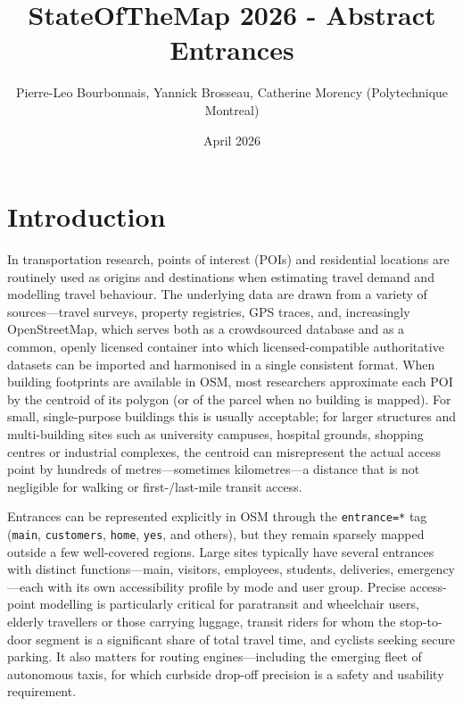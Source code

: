 \documentclass{article}
\title{StateOfTheMap 2026 - Abstract Entrances}
\author{Pierre-Leo Bourbonnais, Yannick Brosseau, Catherine Morency (Polytechnique Montreal)}
\date{April 2026}
\begin{document}
\maketitle



\section{Introduction}

In transportation research, points of interest (POIs) and residential
locations are routinely used as origins and destinations when
estimating travel demand and modelling travel behaviour. The
underlying data are drawn from a variety of sources---travel surveys,
property registries, GPS traces, and, increasingly OpenStreetMap,
which serves both as a crowdsourced database and as a common,
openly licensed container into which licensed-compatible authoritative
datasets can be imported and harmonised in a single consistent
format. When building footprints are available in OSM, most
researchers approximate each POI by the centroid of its polygon (or
of the parcel when no building is mapped). For small, single-purpose
buildings this is usually acceptable; for larger structures and
multi-building sites such as university campuses, hospital grounds,
shopping centres or industrial complexes, the centroid can
misrepresent the actual access point by hundreds of
metres---sometimes kilometres---a distance that is not negligible for
walking or first-/last-mile transit access.

Entrances can be represented explicitly in OSM through the
\texttt{entrance=*} tag (\texttt{main}, \texttt{customers},
\texttt{home}, \texttt{yes}, and others), but they remain sparsely
mapped outside a few well-covered regions. Large sites typically have
several entrances with distinct functions---main, visitors,
employees, students, deliveries, emergency---each with its own
accessibility profile by mode and user group. Precise access-point
modelling is particularly critical for paratransit and wheelchair
users, elderly travellers or those carrying luggage, transit riders
for whom the stop-to-door segment is a significant share of total
travel time, and cyclists seeking secure parking. It also matters
for routing engines---including the emerging fleet of autonomous
taxis, for which curbside drop-off precision is a safety and
usability requirement.
\end{document}
